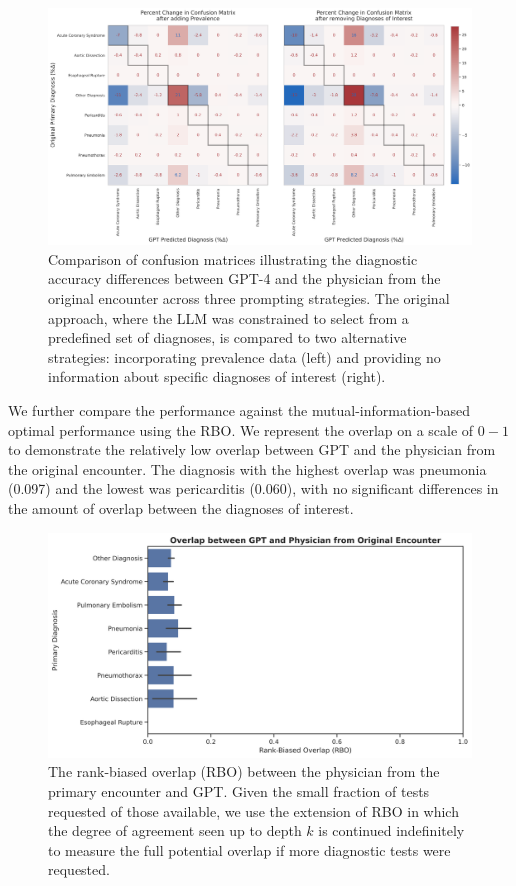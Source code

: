 \begin{figure}[H]
	\centering
	\includegraphics[width=\textwidth] {figures/aim3/diff_confmat_GPT.png}
	\caption{Comparison of confusion matrices illustrating the diagnostic accuracy differences between GPT-4 and the physician from the original encounter across three prompting strategies. The original approach, where the LLM was constrained to select from a predefined set of diagnoses, is compared to two alternative strategies: incorporating prevalence data (left) and providing no information about specific diagnoses of interest (right).} \label{fig:aim3-diff-confmat}
\end{figure}

We further compare the performance against the mutual-information-based optimal performance using the RBO. We represent the overlap on a scale of $0-1$ to demonstrate the relatively low overlap between GPT and the physician from the original encounter. The diagnosis with the highest overlap was pneumonia (0.097) and the lowest was pericarditis (0.060), with no significant differences in the amount of overlap between the diagnoses of interest. 

\begin{figure}[H]
	\centering
	\includegraphics[width=\textwidth] {figures/aim3/optimal_overlap.png}
	\caption{The rank-biased overlap (RBO) between the physician from the primary encounter and GPT. Given the small fraction of tests requested of those available, we use the extension of RBO in which the degree of agreement seen up to depth $k$ is continued indefinitely to measure the full potential overlap if more diagnostic tests were requested.} \label{fig:aim3-optimal-overlap}
\end{figure}

